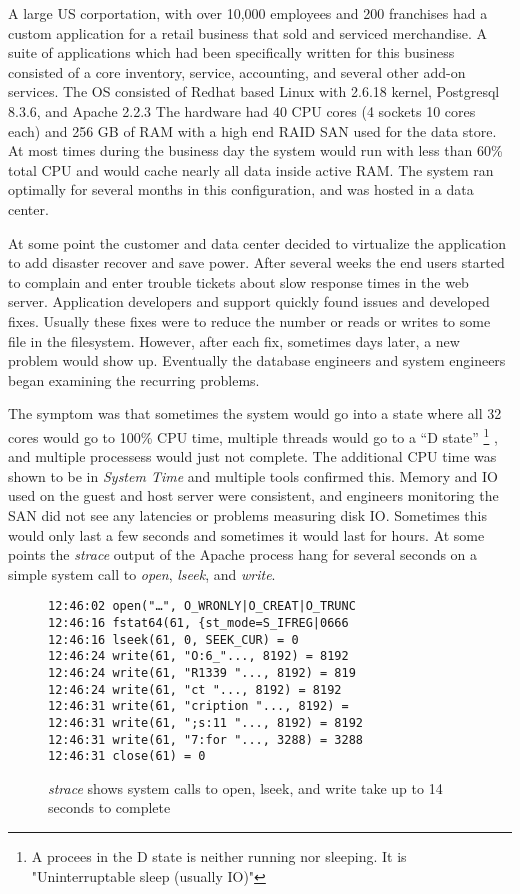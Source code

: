 A large US corportation, with over 10,000 employees and 200 franchises had a custom application for a retail business that sold and serviced merchandise.  A suite of applications which had been specifically written for this business consisted of a core inventory, service, accounting, and several other add-on services.  The OS consisted of Redhat based Linux with 2.6.18 kernel, Postgresql 8.3.6, and Apache 2.2.3 The hardware had 40 CPU cores (4 sockets 10 cores each) and 256 GB of RAM with a high end RAID SAN used for the data store.  At most times during the business day the system would run with less than 60\% total CPU and would cache nearly all data inside active RAM.   The system ran optimally for several months in this configuration, and was hosted in a data center.

\indent At some point the customer and data center decided to virtualize the application to add disaster recover and save power.  After several weeks the end users started to complain and enter trouble tickets about slow response times in the web server.  Application developers and support quickly found issues and developed fixes.   Usually these fixes were to reduce the number or reads or writes to some file in the filesystem.  However, after each fix, sometimes days later, a new problem would show up.  Eventually the database engineers and system engineers began examining the recurring problems.

\indent The symptom was that sometimes the system would go into a state where all 32 cores would go to 100\% CPU time, multiple threads would go to a “D state” \footnote{A procees in the D state is neither running nor sleeping.  It is "Uninterruptable sleep (usually IO)"} , and multiple processess would just not complete.   The additional CPU time was shown to be in \emph{System Time} and multiple tools confirmed this.  Memory and IO used on the guest and host server were consistent, and engineers monitoring the SAN did not see any latencies or problems measuring disk IO.  Sometimes this would only last a few seconds and sometimes it would last for hours. At some points the \emph{strace} output of the Apache process hang for several seconds on a simple system call to \emph{open}, \emph{lseek}, and \emph{write}.

\begin{figure}
\begin{Verbatim}
12:46:02 open("…", O_WRONLY|O_CREAT|O_TRUNC
12:46:16 fstat64(61, {st_mode=S_IFREG|0666 
12:46:16 lseek(61, 0, SEEK_CUR) = 0 
12:46:24 write(61, "O:6_"..., 8192) = 8192 
12:46:24 write(61, "R1339 "..., 8192) = 819 
12:46:24 write(61, "ct "..., 8192) = 8192 
12:46:31 write(61, "cription "..., 8192) =  
12:46:31 write(61, ";s:11 "..., 8192) = 8192 
12:46:31 write(61, "7:for "..., 3288) = 3288 
12:46:31 close(61) = 0
\end{Verbatim}
\label{fig:syscalls}
\caption{\emph{strace} shows system calls to open, lseek, and write take up to 14 seconds to complete}
\end{figure}

